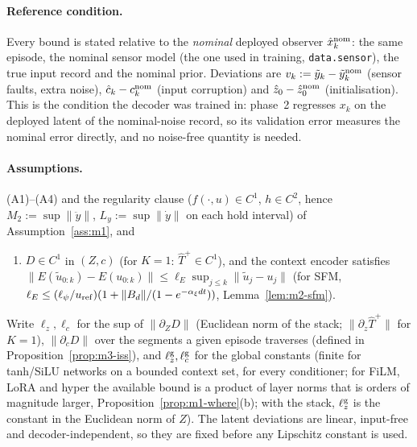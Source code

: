 \paragraph{Reference condition.} Every bound is stated relative to the \emph{nominal} deployed
observer $\hat x^{\rm nom}_k$: the same episode, the nominal sensor model (the one used in training,
\texttt{data.sensor}), the true input record and the nominal prior. Deviations are
$v_k:=\tilde y_k-\tilde y^{\rm nom}_k$ (sensor faults, extra noise), $\hat c_k-c^{\rm nom}_k$ (input
corruption) and $\hat z_0-\hat z^{\rm nom}_0$ (initialisation). This is the condition the decoder
was trained in: phase~2 regresses $x_k$ on the deployed latent of the nominal-noise record, so its
validation error measures the nominal error directly, and no noise-free quantity is needed.

\paragraph{Assumptions.} (A1)--(A4) and the regularity clause ($f(\cdot,u)\in C^1$, $h\in C^2$,
hence $M_2:=\sup\|\ddot y\|$, $L_y:=\sup\|\dot y\|$ on each hold interval) of
Assumption~\ref{ass:m1}, and
\begin{enumerate}
\item[(L)] $D\in C^1$ in $(Z,c)$ (for $K=1$: $\hat T^{+}\in C^1$), and the context encoder satisfies
$\|E(\tilde u_{0:k})-E(u_{0:k})\|\le\ell_E\sup_{j\le k}\|\tilde u_j-u_j\|$ (for SFM,
$\ell_E\le(\ell_\psi/u_{\rm ref})(1+\|B_d\|/(1-e^{-\alpha_\xi dt}))$, Lemma~\ref{lem:m2-sfm}).
\end{enumerate}
Write $\ell_z,\ell_c$ for the sup of $\|\partial_ZD\|$ (Euclidean norm of the stack; $\|\partial_z\hat T^{+}\|$ for $K=1$), $\|\partial_cD\|$ over the
segments a given episode traverses (defined in Proposition~\ref{prop:m3-iss}), and
$\ell^{\rm g}_z,\ell^{\rm g}_c$ for the global constants (finite for tanh/SiLU networks on a bounded
context set, for every conditioner; for FiLM, LoRA and hyper the available bound is a product of layer norms that is
orders of magnitude larger, Proposition~\ref{prop:m1-where}(b); with the stack, $\ell^{\rm g}_z$ is the constant in the
Euclidean norm of $Z$). The latent deviations are linear,
input-free and decoder-independent, so they are fixed before any Lipschitz constant is used.

